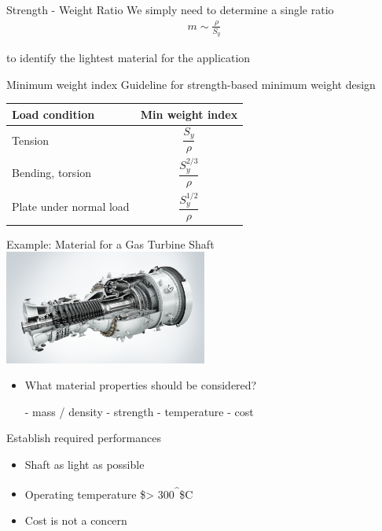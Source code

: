 \documentclass[10pt, svgnames]{beamer}
\begin{document}
\begin{frame}[label={sec:org1de6672}]{Strength - Weight Ratio}
We simply need to determine a single ratio
\begin{gather*}
  m \sim \frac{\rho}{S_y}
\end{gather*}

to identify the lightest material for the application
\end{frame}



\begin{frame}[label={sec:orgf93f10e}]{Minimum weight index}
Guideline for strength-based minimum weight design

\centering
\begin{tabular}{l c}
  \toprule
  Load condition & Min weight index \\
  \midrule
  Tension & $\dfrac{S_y}{\rho}$ \\[10pt]
  Bending, torsion & $\dfrac{S_y^{2/3}}{\rho}$ \\[10pt]
  Plate under normal load & $\dfrac{S_y^{1/2}}{\rho}$ \\
  \bottomrule
\end{tabular}
\end{frame}


\begin{frame}[label={sec:org605081c}]{Example: Material for a Gas Turbine Shaft}
\centering
\includegraphics[width=0.5\textwidth]{pictures/gas-turbine-shaft}

\begin{itemize}
\item What material properties should be considered?

\pause - mass / density
\pause - strength
\pause - temperature
\pause - cost
\end{itemize}
\end{frame}

\begin{frame}[label={sec:org13b7044}]{Establish required performances}
\begin{itemize}
\item Shaft as light as possible
\item Operating temperature \$> 300\textsuperscript{\^{}}\$C
\item Cost is not a concern
\end{itemize}
\end{frame}
\end{document}
